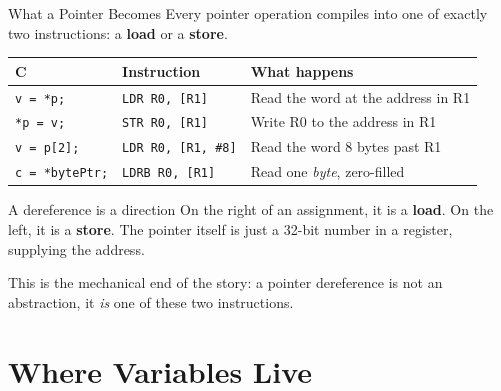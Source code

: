 \documentclass[9pt,aspectratio=169,xcolor=table]{beamer}
\newcommand{\striped}{\rowcolors{1}{white}{stripe}}
\begin{document}
\begin{frame}{What a Pointer Becomes}
    \leavevmode
    Every pointer operation compiles into one of exactly \alert{two}
    instructions: a \textbf{load} or a \textbf{store}.

    \vspace{2mm}
    \begin{center}
    {\small
    \striped
    \begin{tabular}{@{}l l R{.44\textwidth}@{}}
        \toprule
        \textbf{C} & \textbf{Instruction} & \textbf{What happens} \\
        \midrule
        \texttt{v = *p;}       & \texttt{LDR R0, [R1]}      & Read the word at the address in R1 \\
        \texttt{*p = v;}       & \texttt{STR R0, [R1]}      & Write R0 to the address in R1 \\
        \texttt{v = p[2];}     & \texttt{LDR R0, [R1, \#8]} & Read the word 8 bytes past R1 \\
        \texttt{c = *bytePtr;} & \texttt{LDRB R0, [R1]}     & Read one \emph{byte}, zero-filled \\
        \bottomrule
    \end{tabular}}
    \end{center}

    \vspace{2mm}
    \begin{block}{A dereference is a direction}
        On the \alert{right} of an assignment, it is a \textbf{load}.
        On the \alert{left}, it is a \textbf{store}. The pointer
        itself is just a 32-bit number in a register, supplying the
        address.
    \end{block}

    \vspace{2mm}
    {\small This is the mechanical end of the story: a pointer
    dereference is not an abstraction, it \emph{is} one of these two
    instructions.}
\end{frame}

\section{Where Variables Live}
\end{document}
